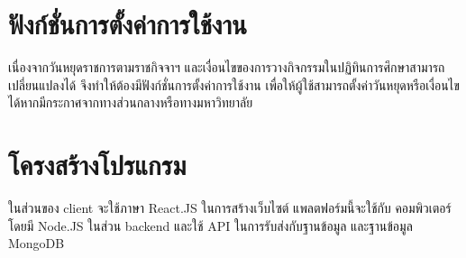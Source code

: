 \section{ฟังก์ชั่นการตั้งค่าการใช้งาน}
เนื่องจากวันหยุดราชการตามราชกิจจาฯ และเงื่อนไขของการวางกิจกรรมในปฏิทินการศึกษาสามารถเปลี่ยนแปลงได้ 
จึงทำให้ต้องมีฟังก์ชั่นการตั้งค่าการใช้งาน เพื่อให้ผู้ใช้สามารถตั้งค่าวันหยุดหรือเงื่อนไขได้หากมีกระกาศจากทางส่วนกลางหรือทางมหาวิทยาลัย

\section{โครงสร้างโปรแกรม}
ในส่วนของ client จะใช้ภาษา React.JS ในการสร้างเว็บไซต์ แพลตฟอร์มนี้จะใช้กับ
คอมพิวเตอร์ โดยมี Node.JS ในส่วน backend และใช้ API ในการรับส่งกับฐานข้อมูล
และฐานข้อมูล MongoDB
